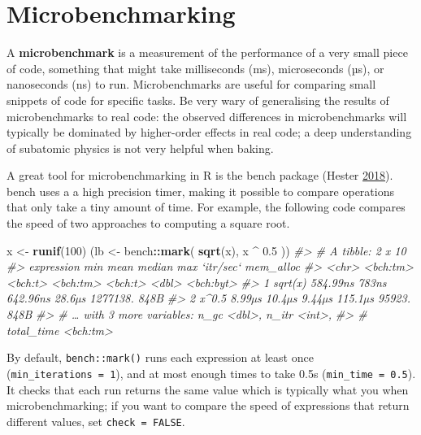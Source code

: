 \documentclass[]{book}
\newenvironment{Shaded}{\begin{snugshade}}{\end{snugshade}}
\newcommand{\CommentTok}[1]{\textcolor[rgb]{0.37,0.37,0.37}{\textit{#1}}}
\newcommand{\DecValTok}[1]{\textcolor[rgb]{0.06,0.06,0.06}{#1}}
\newcommand{\FloatTok}[1]{\textcolor[rgb]{0.06,0.06,0.06}{#1}}
\newcommand{\KeywordTok}[1]{\textcolor[rgb]{0.27,0.27,0.27}{\textbf{#1}}}
\newcommand{\NormalTok}[1]{#1}
\newcommand{\OperatorTok}[1]{\textcolor[rgb]{0.43,0.43,0.43}{\textbf{#1}}}
\newcommand{\StringTok}[1]{\textcolor[rgb]{0.5,0.5,0.5}{#1}}
\begin{document}
\hypertarget{microbenchmarking}{%
\section{Microbenchmarking}\label{microbenchmarking}}


A \textbf{microbenchmark} is a measurement of the performance of a very small piece of code, something that might take milliseconds (ms), microseconds (µs), or nanoseconds (ns) to run. Microbenchmarks are useful for comparing small snippets of code for specific tasks. Be very wary of generalising the results of microbenchmarks to real code: the observed differences in microbenchmarks will typically be dominated by higher-order effects in real code; a deep understanding of subatomic physics is not very helpful when baking.

A great tool for microbenchmarking in R is the bench package (Hester \protect\hyperlink{ref-bench}{2018}). bench uses a a high precision timer, making it possible to compare operations that only take a tiny amount of time. For example, the following code compares the speed of two approaches to computing a square root.

\begin{Shaded}
\begin{Highlighting}[]
\NormalTok{x <-}\StringTok{ }\KeywordTok{runif}\NormalTok{(}\DecValTok{100}\NormalTok{)}
\NormalTok{(lb <-}\StringTok{ }\NormalTok{bench}\OperatorTok{::}\KeywordTok{mark}\NormalTok{(}
  \KeywordTok{sqrt}\NormalTok{(x),}
\NormalTok{  x }\OperatorTok{^}\StringTok{ }\FloatTok{0.5}
\NormalTok{))}
\CommentTok{#> # A tibble: 2 x 10}
\CommentTok{#>   expression      min    mean   median     max `itr/sec` mem_alloc}
\CommentTok{#>   <chr>      <bch:tm> <bch:t> <bch:tm> <bch:t>     <dbl> <bch:byt>}
\CommentTok{#> 1 sqrt(x)    584.99ns   783ns 642.96ns  28.6µs  1277138.      848B}
\CommentTok{#> 2 x^0.5        8.99µs  10.4µs   9.44µs 115.1µs    95923.      848B}
\CommentTok{#> # … with 3 more variables: n_gc <dbl>, n_itr <int>,}
\CommentTok{#> #   total_time <bch:tm>}
\end{Highlighting}
\end{Shaded}

By default, \texttt{bench::mark()} runs each expression at least once (\texttt{min\_iterations\ =\ 1}), and at most enough times to take 0.5s (\texttt{min\_time\ =\ 0.5}). It checks that each run returns the same value which is typically what you when microbenchmarking; if you want to compare the speed of expressions that return different values, set \texttt{check\ =\ FALSE}.
\end{document}
